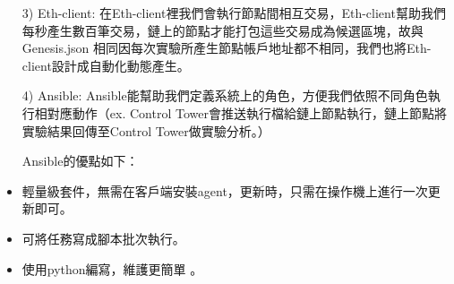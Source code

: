 \begin{itemize}
\item [3)]Eth-client: 在Eth-client裡我們會執行節點間相互交易，Eth-client幫助我們每秒產生數百筆交易，鏈上的節點才能打包這些交易成為候選區塊，故與Genesis.json 相同因每次實驗所產生節點帳戶地址都不相同，我們也將Eth-client設計成自動化動態產生。 

\item [4)] Ansible: Ansible能幫助我們定義系統上的角色，方便我們依照不同角色執行相對應動作（ex. Control Tower會推送執行檔給鏈上節點執行，鏈上節點將實驗結果回傳至Control Tower做實驗分析。）

Ansible的優點如下：

\item 輕量級套件，無需在客戶端安裝agent，更新時，只需在操作機上進行一次更新即可。

\item 可將任務寫成腳本批次執行。

\item 使用python編寫，維護更簡單 。
\end{itemize}